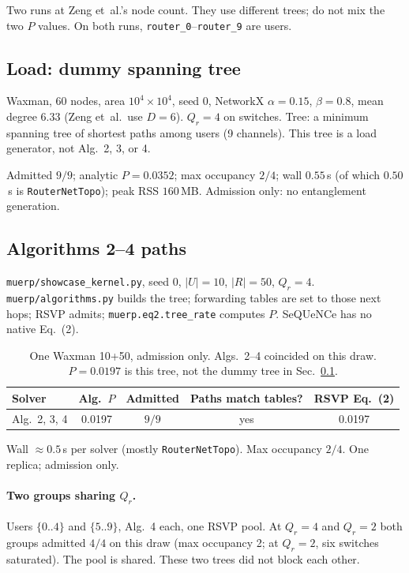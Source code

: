 \documentclass[11pt]{article}
\begin{document}
Two runs at Zeng et~al.'s node count.
They use different trees; do not mix the two $P$ values.
On both runs, \texttt{router\_0}--\texttt{router\_9} are users.

\subsection{Load: dummy spanning tree}
\label{sec:waxman}

Waxman, 60 nodes, area $10^4\times 10^4$, seed 0, NetworkX $\alpha=0.15$, $\beta=0.8$, mean degree $6.33$ (Zeng et~al.\ use $D=6$).
$Q_r=4$ on switches.
Tree: a minimum spanning tree of shortest paths among users (9 channels).
This tree is a load generator, not Alg.~2, 3, or 4.

Admitted $9/9$; analytic $P=0.0352$; max occupancy $2/4$; wall $0.55$\,s (of which $0.50$\,s is \texttt{RouterNetTopo}); peak RSS $160$\,MB.
Admission only: no entanglement generation.

\subsection{Algorithms 2--4 paths}
\label{sec:kernel60}

\texttt{muerp/showcase\_kernel.py}, seed 0, $|U|=10$, $|R|=50$, $Q_r=4$.
\texttt{muerp/algorithms.py} builds the tree; forwarding tables are set to those next hops; RSVP admits; \texttt{muerp.eq2.tree\_rate} computes $P$.
SeQUeNCe has no native Eq.~(2).

\begin{table}[h]
\centering
\caption{One Waxman 10+50, admission only. Algs.~2--4 coincided on this draw. $P=0.0197$ is this tree, not the dummy tree in Sec.~\ref{sec:waxman}.}
\label{tab:kernel60}
\begin{tabular}{@{}lcccc@{}}
\toprule
Solver & Alg.~$P$ & Admitted & Paths match tables? & RSVP Eq.~(2) \\
\midrule
Alg.~2, 3, 4 & 0.0197 & $9/9$ & yes & 0.0197 \\
\bottomrule
\end{tabular}
\end{table}

Wall $\approx 0.5$\,s per solver (mostly \texttt{RouterNetTopo}). Max occupancy $2/4$.
One replica; admission only.

\paragraph{Two groups sharing $Q_r$.}
Users $\{0..4\}$ and $\{5..9\}$, Alg.~4 each, one RSVP pool.
At $Q_r=4$ and $Q_r=2$ both groups admitted $4/4$ on this draw (max occupancy 2; at $Q_r=2$, six switches saturated).
The pool is shared. These two trees did not block each other.
\end{document}
